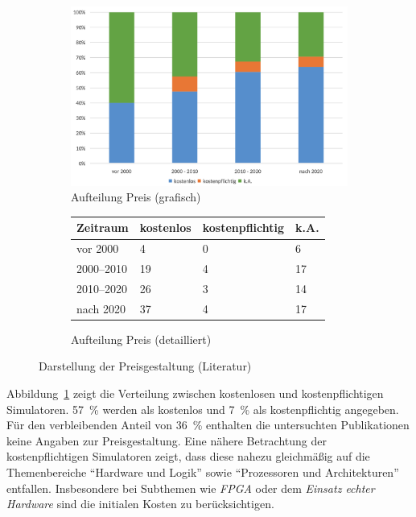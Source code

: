 \begin{figure}[!htbp]
    \centering
    \begin{subfigure}[b]{0.48\textwidth}
        \centering
        \includegraphics[width=\textwidth]{graphics_lit/15-preis-jahr.png}
        \caption{Aufteilung Preis (grafisch)}
        \label{fig:15-preis-jahr}
    \end{subfigure}
    \hfill
    \begin{subfigure}[b]{0.48\textwidth}
        \centering
        \tiny
        \begin{tabularx}{\textwidth}{lXXX}
            \hline
            \textbf{Zeitraum} & \textbf{kostenlos} & \textbf{kostenpflichtig} & \textbf{k.A.} \\
            \hline
            vor 2000      & 4  & 0 & 6  \\
            2000--2010    & 19 & 4 & 17 \\
            2010--2020    & 26 & 3 & 14 \\
            nach 2020     & 37 & 4 & 17 \\
            \hline
        \end{tabularx}
        \caption{Aufteilung Preis (detailliert)}
        \label{tab:15-preis-zeit}
    \end{subfigure}
    \caption{Darstellung der Preisgestaltung (Literatur)}
    \label{fig:15-preis-gesamt}
\end{figure}

Abbildung~\ref{fig:15-preis-jahr} zeigt die Verteilung zwischen kostenlosen und kostenpflichtigen Simulatoren. 57~\% werden als kostenlos und 7~\% als kostenpflichtig angegeben. Für den verbleibenden Anteil von 36~\% enthalten die untersuchten Publikationen keine Angaben zur Preisgestaltung. Eine nähere Betrachtung der kostenpflichtigen Simulatoren zeigt, dass diese nahezu gleichmäßig auf die Themenbereiche \enquote{Hardware und Logik} sowie \enquote{Prozessoren und Architekturen} entfallen. Insbesondere bei Subthemen wie \textit{\ac{FPGA}} oder dem \textit{Einsatz echter Hardware} sind die initialen Kosten zu berücksichtigen.

